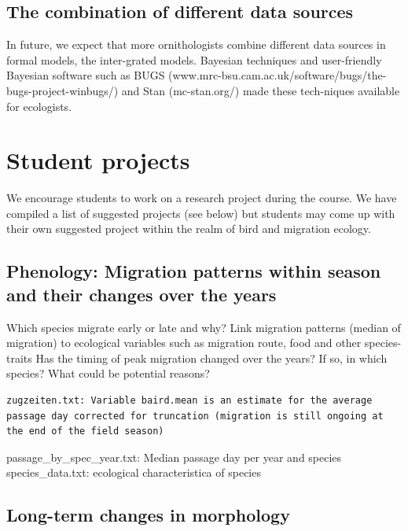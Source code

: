 \documentclass[
]{book}
\begin{document}
\hypertarget{the-combination-of-different-data-sources}{%
\section{The combination of different data sources}\label{the-combination-of-different-data-sources}}

In future, we expect that more ornithologists combine different data sources in formal models, the inter-grated models. Bayesian techniques and user-friendly Bayesian software such as BUGS (www.mrc-bsu.cam.ac.uk/software/bugs/the-bugs-project-winbugs/) and Stan (mc-stan.org/) made these tech-niques available for ecologists.

\hypertarget{student-projects}{%
\chapter{Student projects}\label{student-projects}}

We encourage students to work on a research project during the course. We have compiled a list of suggested projects (see below) but students may come up with their own suggested project within the realm of bird and migration ecology.

\hypertarget{phenology-migration-patterns-within-season-and-their-changes-over-the-years}{%
\section{Phenology: Migration patterns within season and their changes over the years}\label{phenology-migration-patterns-within-season-and-their-changes-over-the-years}}

Which species migrate early or late and why?
Link migration patterns (median of migration) to ecological variables such as migration route, food and other species-traits
Has the timing of peak migration changed over the years? If so, in which species? What could be potential reasons?

\begin{verbatim}
zugzeiten.txt: Variable baird.mean is an estimate for the average passage day corrected for truncation (migration is still ongoing at the end of the field season) 
\end{verbatim}

passage\_by\_spec\_year.txt: Median passage day per year and species
species\_data.txt: ecological characteristica of species

\hypertarget{long-term-changes-in-morphology}{%
\section{Long-term changes in morphology}\label{long-term-changes-in-morphology}}
\end{document}
